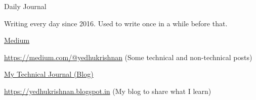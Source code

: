 \newpage
{}
\begin{cventries}
  \cventry
    {Daily Journal}
    {}
    {}
    {}
    {
      \begin{cvitems}
        \item {Writing every day since 2016. Used to write once in a while before that.}
      \end{cvitems}
    }
  \cventry
    {\href{https://medium.com/@yedhukrishnan}{Medium}}
    {}
    {}
    {}
    {
      \begin{cvitems}
        \item {\href{https://medium.com/@yedhukrishnan}{https://medium.com/@yedhukrishnan} (Some technical and non-technical posts)}
      \end{cvitems}
    }
  \cventry
    {\href{https://yedhukrishnan.blogspot.in}{My Technical Journal (Blog)}}
    {}
    {}
    {}
    {
      \begin{cvitems}
        \item {\href{https://yedhukrishnan.blogspot.in}{https://yedhukrishnan.blogspot.in} (My blog to share what I learn)}
      \end{cvitems}
    }
\end{cventries}
